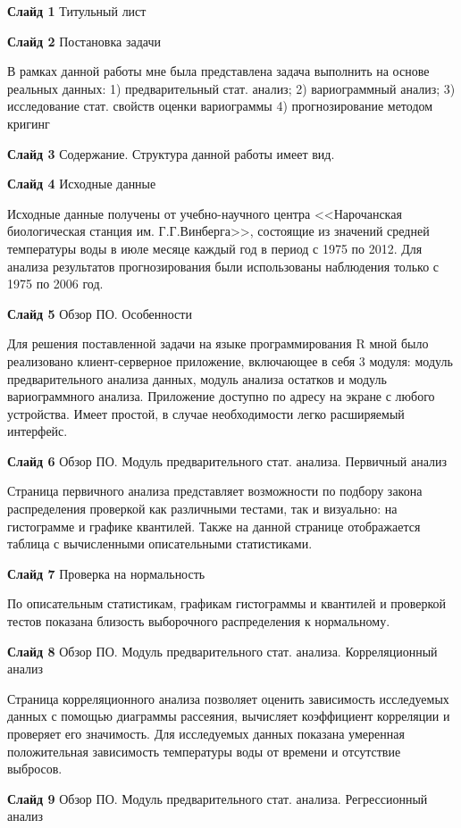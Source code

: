 \documentclass[a4paper,10pt]{report}
\begin{document}
\textbf{Слайд 1} Титульный лист

\textbf{Слайд 2} Постановка задачи

В рамках данной работы мне была представлена задача выполнить на основе реальных данных: 1) предварительный стат. анализ; 2) вариограммный анализ; 3) исследование стат. свойств оценки вариограммы 4) прогнозирование методом кригинг

\textbf{Слайд 3} Содержание. Структура данной работы имеет вид.

\textbf{Слайд 4} Исходные данные

Исходные данные получены от учебно-научного центра <<Нарочанская биологическая станция им. Г.Г.Винберга>>, состоящие из значений средней температуры воды в июле месяце каждый год в период с 1975 по 2012. Для анализа результатов прогнозирования были использованы наблюдения только с 1975 по 2006 год.

\textbf{Слайд 5} Обзор ПО. Особенности

Для решения поставленной задачи на языке программирования R мной было реализовано клиент-серверное приложение, включающее в себя 3 модуля: модуль предварительного анализа данных, модуль анализа остатков и модуль вариограммного анализа. Приложение доступно по адресу на экране с любого устройства. Имеет простой, в случае необходимости легко расширяемый интерфейс.

\textbf{Слайд 6} Обзор ПО. Модуль предварительного стат. анализа. Первичный анализ

Страница первичного анализа представляет возможности по подбору закона распределения проверкой как различными тестами, так и визуально: на гистограмме и графике квантилей. Также на данной странице отображается таблица с вычисленными описательными статистиками.

\textbf{Слайд 7} Проверка на нормальность

По описательным статистикам, графикам гистограммы и квантилей и проверкой тестов показана близость выборочного распределения к нормальному.

\textbf{Слайд 8} Обзор ПО. Модуль предварительного стат. анализа. Корреляционный анализ

Страница корреляционного анализа позволяет оценить зависимость исследуемых данных с помощью диаграммы рассеяния, вычисляет коэффициент корреляции и проверяет его значимость. Для исследуемых данных показана умеренная положительная зависимость температуры воды от времени и отсутствие выбросов.

\textbf{Слайд 9} Обзор ПО. Модуль предварительного стат. анализа. Регрессионный анализ
\end{document}
